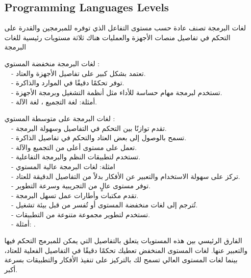   \subsection{Programming Languages Levels}

  \begin{AR}
    لغات البرمجة تصنف عادة حسب مستوى التفاعل الذي توفره للمبرمجين والقدرة على التحكم في تفاصيل منصات الأجهزة والعمليات
    هناك ثلاثة مستويات رئيسية للغات البرمجة

    \LR{\textcolor{theme}{•}} لغات البرمجة منخفضة المستوي  :\\ 
    \ \ - تعتمد بشكل كبير على تفاصيل الأجهزة والعتاد.\\
    \ \ - توفر تحكمًا دقيقًا في الموارد والذاكرة.\\
    \ \ - تستخدم لبرمجة مهام حساسة للأداء مثل أنظمة التشغيل وبرمجة الأجهزة.\\
    \ \ - أمثلة: لغة التجميع ، لغة الآلة.
    
    \LR{\textcolor{theme}{•}} لغات البرمجة على متوسطة المستوي  :\\
    \ \ - تقدم توازنًا بين التحكم في التفاصيل وسهولة البرمجة.\\
    \ \ - تسمح بالوصول إلى بعض العتاد والتحكم في تفاصيل الذاكرة.\\
    \ \ - تعمل على مستوى أعلى من التجميع والآلة.\\
    \ \ - تستخدم لتطبيقات النظم والبرمجة التفاعلية.\\
    \ \ - امثلة: 
\newpage
    \LR{\textcolor{theme}{•}} لغات البرمجة عالية المستوي \\
    \ \ - تركز على سهولة الاستخدام والتعبير عن الأفكار بدلاً من التفاصيل الدقيقة للعتاد.\\
    \ \ - توفر مستوى عالٍ من التجريبية وسرعة التطوير.\\
    \ \ - تقدم مكتبات وأطارات عمل تسهل البرمجة.\\
    \ \ - تُترجم إلى لغات منخفضة المستوى أو تُفسر من قبل بيئة تشغيل.\\
    \ \ - تستخدم لتطوير مجموعة متنوعة من التطبيقات.\\
    \ \ - أمثلة: .

    الفارق الرئيسي بين هذه المستويات يتعلق بالتفاصيل التي يمكن للمبرمج التحكم فيها والتعبير عنها. لغات المستوى المنخفض تعطيك تحكمًا دقيقًا في التفاصيل الفعلية للعتاد، بينما لغات المستوى العالي تسمح لك بالتركيز على تنفيذ الأفكار والتطبيقات بسرعة أكبر.

  \end{AR}

